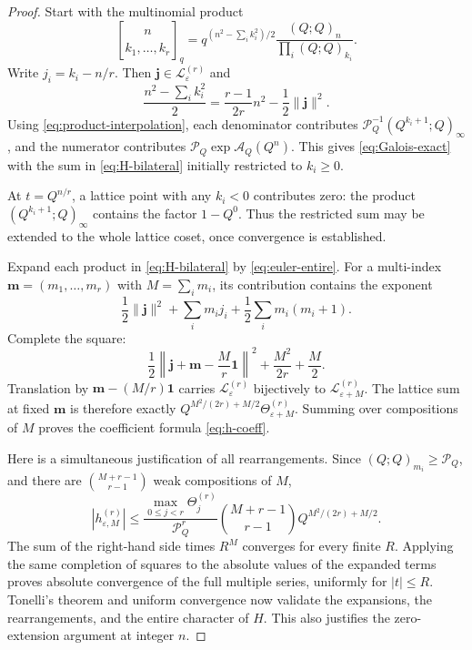 \documentclass[11pt]{article}
\numberwithin{equation}{section}
\theoremstyle{definition}
\newcommand{\pp}[1]{(Q;Q)_{#1}}
\newcommand{\Pinf}{\mathcal P_Q}
\newcommand{\A}{\mathcal A_Q}
\newcommand{\eps}{\varepsilon}
\newcommand{\T}{\Theta}
\begin{document}
\begin{proof}
Start with the multinomial product
\[
 \genfrac{[}{]}{0pt}{}{n}{k_1,\ldots,k_r}_q
 =q^{(n^2-\sum_i k_i^2)/2}
     \frac{\pp{n}}{\prod_i\pp{k_i}}.
\]
Write $j_i=k_i-n/r$. Then $\boldsymbol j\in\mathcal L_{\eps}^{(r)}$ and
\begin{equation}\label{eq:quadratic-completion}
 \frac{n^2-\sum_i k_i^2}{2}
 =\frac{r-1}{2r}n^2-\frac12\|\boldsymbol j\|^2.
\end{equation}
Using \eqref{eq:product-interpolation}, each denominator contributes
$\Pinf^{-1}(Q^{k_i+1};Q)_\infty$, and the numerator contributes
$\Pinf\exp\A(Q^n)$. This gives \eqref{eq:Galois-exact} with the sum in \eqref{eq:H-bilateral} initially restricted to $k_i\ge0$.

At $t=Q^{n/r}$, a lattice point with any $k_i<0$ contributes zero: the product $(Q^{k_i+1};Q)_\infty$ contains the factor $1-Q^0$. Thus the restricted sum may be extended to the whole lattice coset, once convergence is established.

Expand each product in \eqref{eq:H-bilateral} by \eqref{eq:euler-entire}. For a multi-index $\boldsymbol m=(m_1,\ldots,m_r)$ with $M=\sum_i m_i$, its contribution contains the exponent
\[
 \frac12\|\boldsymbol j\|^2
 +\sum_i m_i j_i+\frac12\sum_i m_i(m_i+1).
\]
Complete the square:
\begin{equation}\label{eq:theta-complete}
 \frac12\left\|\boldsymbol j+\boldsymbol m-\frac Mr\boldsymbol1\right\|^2
 +\frac{M^2}{2r}+\frac M2.
\end{equation}
Translation by $\boldsymbol m-(M/r)\boldsymbol1$ carries
$\mathcal L_{\eps}^{(r)}$ bijectively to $\mathcal L_{\eps+M}^{(r)}$.
The lattice sum at fixed $\boldsymbol m$ is therefore exactly
$Q^{M^2/(2r)+M/2}\T_{\eps+M}^{(r)}$.
Summing over compositions of $M$ proves the coefficient formula \eqref{eq:h-coeff}.

Here is a simultaneous justification of all rearrangements. Since
$\pp{m_i}\ge\Pinf$, and there are $\binom{M+r-1}{r-1}$ weak compositions of $M$,
\begin{equation}\label{eq:H-bound}
 |h_{\eps,M}^{(r)}|
 \le\frac{\max_{0\le j<r}\T_j^{(r)}}{\Pinf^r}
 \binom{M+r-1}{r-1}Q^{M^2/(2r)+M/2}.
\end{equation}
The sum of the right-hand side times $R^M$ converges for every finite $R$. Applying the same completion of squares to the absolute values of the expanded terms proves absolute convergence of the full multiple series, uniformly for $|t|\le R$. Tonelli's theorem and uniform convergence now validate the expansions, the rearrangements, and the entire character of $H$. This also justifies the zero-extension argument at integer $n$.
\end{proof}
\end{document}
